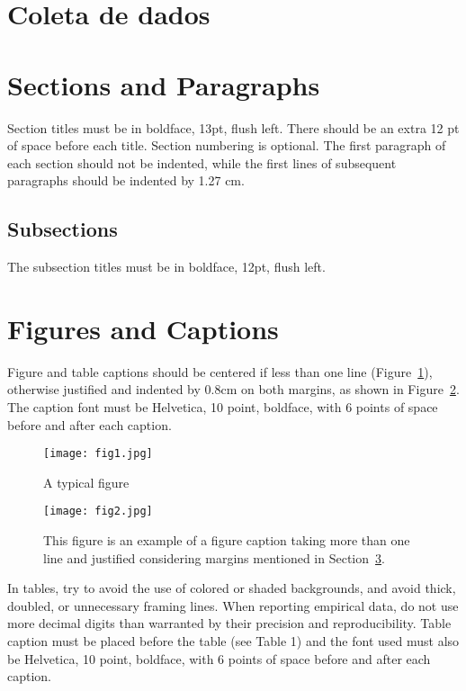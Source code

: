 \documentclass[12pt]{article}
\begin{document}
\section{Coleta de dados}




\section{Sections and Paragraphs}

Section titles must be in boldface, 13pt, flush left. There should be an extra
12 pt of space before each title. Section numbering is optional. The first
paragraph of each section should not be indented, while the first lines of
subsequent paragraphs should be indented by 1.27 cm.

\subsection{Subsections}

The subsection titles must be in boldface, 12pt, flush left.

\section{Figures and Captions}\label{sec:figs}


Figure and table captions should be centered if less than one line
(Figure~\ref{fig:exampleFig1}), otherwise justified and indented by 0.8cm on
both margins, as shown in Figure~\ref{fig:exampleFig2}. The caption font must
be Helvetica, 10 point, boldface, with 6 points of space before and after each
caption.

\begin{figure}[ht]
\centering
\texttt{[image: fig1.jpg]}
\caption{A typical figure}
\label{fig:exampleFig1}
\end{figure}

\begin{figure}[ht]
\centering
\texttt{[image: fig2.jpg]}
\caption{This figure is an example of a figure caption taking more than one
  line and justified considering margins mentioned in Section~\ref{sec:figs}.}
\label{fig:exampleFig2}
\end{figure}

In tables, try to avoid the use of colored or shaded backgrounds, and avoid
thick, doubled, or unnecessary framing lines. When reporting empirical data,
do not use more decimal digits than warranted by their precision and
reproducibility. Table caption must be placed before the table (see Table 1)
and the font used must also be Helvetica, 10 point, boldface, with 6 points of
space before and after each caption.
\end{document}
